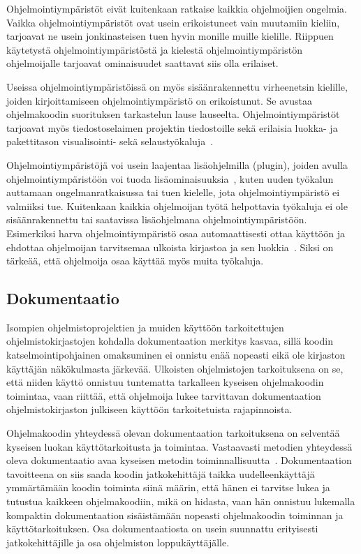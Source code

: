 \documentclass[finnish]{tktltiki2}
\theoremstyle{definition}
\theoremstyle{remark}
\begin{document}
Ohjelmointiympäristöt eivät kuitenkaan ratkaise kaikkia ohjelmoijien ongelmia. Vaikka ohjelmointiympäristöt ovat usein erikoistuneet vain muutamiin kieliin, tarjoavat ne usein jonkinasteisen tuen hyvin monille muille kielille. Riippuen käytetystä ohjelmointiympäristöstä ja kielestä ohjelmointiympäristön ohjelmoijalle tarjoavat ominaisuudet saattavat siis olla erilaiset.

Useissa ohjelmointiympäristöissä on myös sisäänrakennettu virheenetsin kielille, joiden kirjoittamiseen ohjelmointiympäristö on erikoistunut. Se avustaa ohjelmakoodin suorituksen tarkastelun lause lauseelta. Ohjelmointiympäristöt tarjoavat myös tiedostoselaimen projektin tiedostoille sekä erilaisia luokka- ja pakettitason visualisointi- sekä selaustyökaluja~\cite{eclipse-ide}.

Ohjelmointiympäristöjä voi usein laajentaa lisäohjelmilla (plugin), joiden avulla ohjelmointiympäristöön voi tuoda lisäominaisuuksia~\cite{eclipse-ide}, kuten uuden työkalun auttamaan ongelmanratkaisussa tai tuen kielelle, jota ohjelmointiympäristö ei valmiiksi tue. Kuitenkaan kaikkia ohjelmoijan työtä helpottavia työkaluja ei ole sisäänrakennettu tai saatavissa lisäohjelmana ohjelmointiympäristöön. Esimerkiksi harva ohjelmointiympäristö osaa automaattisesti ottaa käyttöön ja ehdottaa ohjelmoijan tarvitsemaa ulkoista kirjastoa ja sen luokkia~\cite{jungloid-mining}. Siksi on tärkeää, että ohjelmoija osaa käyttää myös muita työkaluja.

\subsection{Dokumentaatio}
Isompien ohjelmistoprojektien ja muiden käyttöön tarkoitettujen ohjelmistokirjastojen kohdalla dokumentaation merkitys kasvaa, sillä koodin katselmointipohjainen omaksuminen ei onnistu enää nopeasti eikä ole kirjaston käyttäjän näkökulmasta järkevää. Ulkoisten ohjelmistojen tarkoituksena on se, että niiden käyttö onnistuu tuntematta tarkalleen kyseisen ohjelmakoodin toimintaa, vaan riittää, että ohjelmoija lukee tarvittavan dokumentaation ohjelmistokirjaston julkiseen käyttöön tarkoitetuista rajapinnoista.

Ohjelmakoodin yhteydessä olevan dokumentaation tarkoituksena on selventää kyseisen luokan käyttötarkoitusta ja toimintaa. Vastaavasti metodien yhteydessä oleva dokumentaatio avaa kyseisen metodin toiminnallisuutta~\cite{javadoc}.
Dokumentaation tavoitteena on siis saada koodin jatkokehittäjä taikka uudelleenkäyttäjä ymmärtämään koodin toiminta siinä määrin, että hänen ei tarvitse lukea ja tutustua kaikkeen ohjelmakoodiin, mikä on hidasta, vaan hän onnistuu lukemalla kompaktin dokumentaation sisäistämään nopeasti ohjelmakoodin toiminnan ja käyttötarkoituksen.
Osa dokumentaatiosta on usein suunnattu erityisesti jatkokehittäjille ja osa ohjelmiston loppukäyttäjälle.
\end{document}
